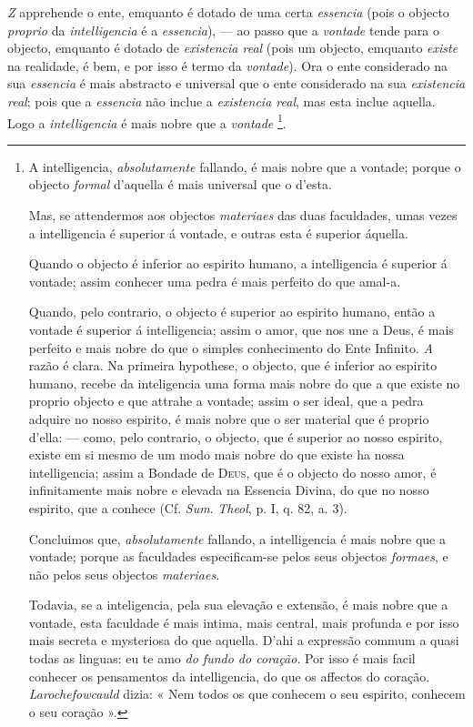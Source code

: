 \emph{Z} apprehende o ente, emquanto é dotado de uma certa \emph{essencia}   (pois o objecto \emph{proprio} da \emph{intelligencia} é a \emph{essencia}), --- ao passo que a \emph{vontade} tende para o objecto, emquanto é dotado de \emph{existencia real} (pois um objecto, emquanto \emph{existe} na realidade, é bem, e por isso é termo da \emph{vontade}). Ora o ente considerado   na sua \emph{essencia} é mais abstracto e universal que o ente considerado na sua \emph{existencia real}; pois que a \emph{essencia} não inclue a \emph{existencia real}, mas esta inclue aquella. Logo a \emph{intelligencia} é mais nobre que a \emph{vontade} \footnote{A intelligencia, \emph{absolutamente} fallando, é mais nobre que a vontade; porque o objecto \emph{formal} d'aquella é mais universal que o d'esta.\par Mas, se attendermos aos objectos \emph{materiaes} das duas faculdades, umas vezes a intelligencia é superior á vontade, e outras esta é superior áquella.\par Quando o objecto é inferior ao espirito humano, a intelligencia é superior á vontade; assim conhecer uma pedra é mais perfeito do que amal-a.\par Quando, pelo contrario, o objecto é superior ao espirito humano, então a vontade é superior á intelligencia; assim o amor, que nos une a Deus, é mais perfeito e mais nobre do que o simples conhecimento do Ente Infinito. \emph{A} razão é clara. Na primeira hypothese, o objecto, que é inferior ao espirito humano, recebe da inteligencia uma forma mais nobre do que a que existe no proprio objecto e que attrahe a vontade; assim o ser ideal, que a pedra adquire no nosso espirito, é mais nobre que o ser material que é proprio d'ella: --- como, pelo contrario, o objecto, que é superior ao nosso espirito, existe em si mesmo de um modo mais nobre do que existe ha nossa intelligencia; assim a Bondade de \textsc{Deus}, que é o objecto do nosso amor, é infinitamente mais nobre e elevada na Essencia Divina, do que no nosso espirito, que a conhece (Cf. \emph{Sum}. \emph{Theol}, p. I, q. 82, a. 3).\par Concluimos que, \emph{absolutamente} fallando, a intelligencia é mais nobre que a vontade; porque as faculdades especificam-se pelos seus objectos \emph{formaes}, e não pelos seus objectos \emph{materiaes}.\par Todavia, se a inteligencia, pela sua elevação e extensão, é mais nobre que a vontade, esta faculdade é mais intima, mais central, mais profunda e por isso mais secreta e mysteriosa do que aquella. D'ahi a expressão commum a quasi todas as linguas: eu te amo \emph{do fundo do coração}. Por isso é mais facil conhecer os pensamentos da intelligencia, do que os affectos do coração. \emph{Larochefowcauld} dizia: « Nem todos os que conhecem o seu espirito, conhecem o seu coração ».}.

